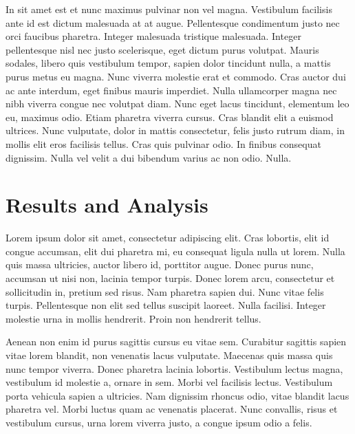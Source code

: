 \documentclass[a4paper]{article}
\begin{document}
In sit amet est et nunc maximus pulvinar non vel magna. Vestibulum facilisis ante id est dictum malesuada at at augue. Pellentesque condimentum justo nec orci faucibus pharetra. Integer malesuada tristique malesuada. Integer pellentesque nisl nec justo scelerisque, eget dictum purus volutpat. Mauris sodales, libero quis vestibulum tempor, sapien dolor tincidunt nulla, a mattis purus metus eu magna. Nunc viverra molestie erat et commodo. Cras auctor dui ac ante interdum, eget finibus mauris imperdiet. Nulla ullamcorper magna nec nibh viverra congue nec volutpat diam. Nunc eget lacus tincidunt, elementum leo eu, maximus odio. Etiam pharetra viverra cursus. Cras blandit elit a euismod ultrices. Nunc vulputate, dolor in mattis consectetur, felis justo rutrum diam, in mollis elit eros facilisis tellus. Cras quis pulvinar odio. In finibus consequat dignissim. Nulla vel velit a dui bibendum varius ac non odio. Nulla.


\section{Results and Analysis}

%

Lorem ipsum dolor sit amet, consectetur adipiscing elit. Cras lobortis, elit id congue accumsan, elit dui pharetra mi, eu consequat ligula nulla ut lorem. Nulla quis massa ultricies, auctor libero id, porttitor augue. Donec purus nunc, accumsan ut nisi non, lacinia tempor turpis. Donec lorem arcu, consectetur et sollicitudin in, pretium sed risus. Nam pharetra sapien dui. Nunc vitae felis turpis. Pellentesque non elit sed tellus suscipit laoreet. Nulla facilisi. Integer molestie urna in mollis hendrerit. Proin non hendrerit tellus.

Aenean non enim id purus sagittis cursus eu vitae sem. Curabitur sagittis sapien vitae lorem blandit, non venenatis lacus vulputate. Maecenas quis massa quis nunc tempor viverra. Donec pharetra lacinia lobortis. Vestibulum lectus magna, vestibulum id molestie a, ornare in sem. Morbi vel facilisis lectus. Vestibulum porta vehicula sapien a ultricies. Nam dignissim rhoncus odio, vitae blandit lacus pharetra vel. Morbi luctus quam ac venenatis placerat. Nunc convallis, risus et vestibulum cursus, urna lorem viverra justo, a congue ipsum odio a felis.
\end{document}
